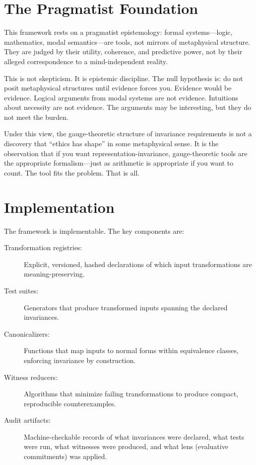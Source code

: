 \documentclass[12pt]{article}
\begin{document}
\section{The Pragmatist Foundation}

This framework rests on a pragmatist epistemology: formal systems---logic,
mathematics, modal semantics---are tools, not mirrors of metaphysical structure.
They are judged by their utility, coherence, and predictive power, not by their alleged
correspondence to a mind-independent reality.

This is not skepticism. It is epistemic discipline. The null hypothesis is: do not posit
metaphysical structures until evidence forces you. Evidence would be evidence.
Logical arguments from modal systems are not evidence. Intuitions about necessity
are not evidence. The arguments may be interesting, but they do not meet the
burden.

Under this view, the gauge-theoretic structure of invariance requirements is not a
discovery that ``ethics has shape'' in some metaphysical sense. It is the observation
that if you want representation-invariance, gauge-theoretic tools are the appropriate
formalism---just as arithmetic is appropriate if you want to count. The tool fits the
problem. That is all.

\section{Implementation}

The framework is implementable. The key components are:

\begin{description}
  \item[Transformation registries:] Explicit, versioned, hashed declarations of
    which input transformations are meaning-preserving.
  \item[Test suites:] Generators that produce transformed inputs spanning the
    declared invariances.
  \item[Canonicalizers:] Functions that map inputs to normal forms within
    equivalence classes, enforcing invariance by construction.
  \item[Witness reducers:] Algorithms that minimize failing transformations to
    produce compact, reproducible counterexamples.
  \item[Audit artifacts:] Machine-checkable records of what invariances were
    declared, what tests were run, what witnesses were produced, and what lens
    (evaluative commitments) was applied.
\end{description}
\end{document}
